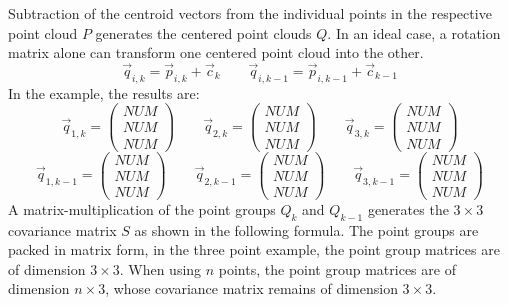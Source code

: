 Subtraction of the centroid vectors from the individual points in the respective point cloud $P$ generates the centered point clouds $Q$. In an ideal case, a rotation matrix alone can transform one centered point cloud into the other. 
\begin{equation*}
    \vec{q}_{i,k}=\vec{p}_{i,k}+\vec{c}_{k} \qquad 
    \vec{q}_{i,k-1}=\vec{p}_{i,k-1}+\vec{c}_{k-1} 
\end{equation*}
In the example, the results are:
\begin{equation*}
    \vec{q}_{1,k}=
    \begin{pmatrix}
        NUM \\
        NUM \\
        NUM
    \end{pmatrix}
    \qquad 
    \vec{q}_{2,k}=
    \begin{pmatrix}
        NUM \\
        NUM \\
        NUM
    \end{pmatrix}
    \qquad     \vec{q}_{3,k}=
    \begin{pmatrix}
        NUM \\
        NUM \\
        NUM
    \end{pmatrix}
\end{equation*}
\begin{equation*}
    \vec{q}_{1,k-1}=
    \begin{pmatrix}
        NUM \\
        NUM \\
        NUM
    \end{pmatrix}
    \qquad 
    \vec{q}_{2,k-1}=
    \begin{pmatrix}
        NUM \\
        NUM \\
        NUM
    \end{pmatrix}
    \qquad     \vec{q}_{3,k-1}=
    \begin{pmatrix}
        NUM \\
        NUM \\
        NUM
    \end{pmatrix}
\end{equation*}
A matrix-multiplication of the point groups $Q_{k}$ and $Q_{k-1}$ generates the $3\times3$ covariance matrix $S$ as shown in the following formula. The point groups are packed in matrix form, in the three point example, the point group matrices are of dimension $3\times3$. When using $n$ points, the point group matrices are of dimension $n\times3$, whose covariance matrix remains of dimension $3\times3$.
